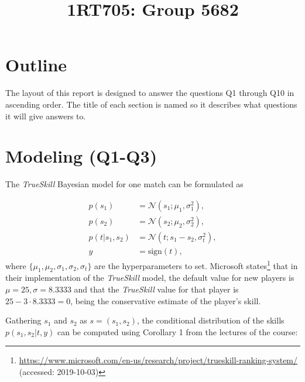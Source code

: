 \documentclass{article}
\title{1RT705: Group 5682}
\begin{document}
	
	\maketitle
%	
	
	\section{Outline}
	The layout of this report is designed to answer the questions Q1 through Q10 in ascending order. The title of each section is named so it describes what questions it will give answers to.
	\section{Modeling (Q1-Q3)}
	\label{sec:modeling}
	The \textit{TrueSkill} Bayesian model for one match can be formulated as
	
	\begin{subequations}
	\begin{align}
	p(s_1) &= \mathcal{N}(s_1; \mu_1, \sigma_1^2),\\
	p(s_2) &= \mathcal{N}(s_2; \mu_2, \sigma_2^2),\\
	p(t|s_1, s_2) &= \mathcal{N}(t; s_1-s_2, \sigma_t^2),\\
	y &= \text{sign}(t),
	\end{align}\label{eqn:model}
	\end{subequations}
	where $ \{\mu_1,\mu_2,\sigma_1,\sigma_2,\sigma_t\} $ are the hyperparameters to set. Microsoft states\footnote{\url{https://www.microsoft.com/en-us/research/project/trueskill-ranking-system/} (accessed: 2019-10-03)} that in their implementation of the \textit{TrueSkill} model, the default value for new players is $ \mu=25, \sigma=8.3333 $ and that the \textit{TrueSkill} value for that player is $25-3\cdot8.3333=0$, being the conservative estimate of the player's skill. 
	
	Gathering $ s_1 $ and $ s_2 $ as $s = (s_1, s_2)$, the conditional distribution of the skills $p(s_1, s_2|t,y)$ can be computed using Corollary 1 from the lectures of the course:
	
\end{document}
